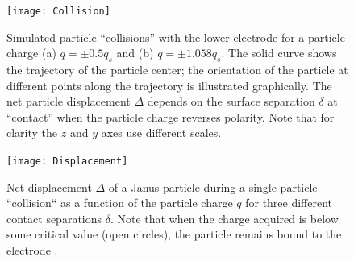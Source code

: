 \begin{appendices}
\begin{figure}[h]
    \centering
    \texttt{[image: Collision]}
    \caption{ Simulated particle ``collisions'' with the lower electrode for a particle charge (a) $q=\pm0.5q_s$ and (b) $q=\pm1.058q_s$. The solid curve shows the trajectory of the particle center; the orientation of the particle at different points along the trajectory is illustrated graphically. The net particle displacement $\Delta$ depends on the surface separation $\delta$ at ``contact'' when the particle charge reverses polarity. Note that for clarity the $z$ and $y$ axes use different scales.}
    \label{fig:Collision}
\end{figure}

\begin{figure}[h]
    \centering
    \texttt{[image: Displacement]}
    \caption{Net displacement $\Delta$ of a Janus particle during a single particle ``collision`` as a function of the particle charge $q$ for three different contact separations $\delta$. Note that when the charge acquired is below some critical value (open circles), the particle remains bound to the electrode \cite{drews2015contact}.}
    \label{fig:Displacement}
\end{figure}








\end{appendices}